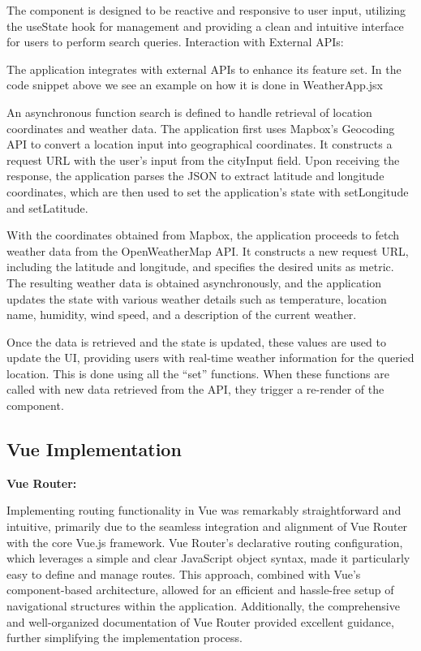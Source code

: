 The component is designed to be reactive and responsive to user input, utilizing the useState hook for management and providing a clean and intuitive interface for users to perform search queries. 
Interaction with External APIs:

 

The application integrates with external APIs to enhance its feature set. In the code snippet above we see an example on how it is done in WeatherApp.jsx

An asynchronous function search is defined to handle retrieval of location coordinates and weather data. The application first uses Mapbox's Geocoding API to convert a location input into geographical coordinates. It constructs a request URL with the user's input from the cityInput field. Upon receiving the response, the application parses the JSON to extract latitude and longitude coordinates, which are then used to set the application's state with setLongitude and setLatitude.

With the coordinates obtained from Mapbox, the application proceeds to fetch weather data from the OpenWeatherMap API. It constructs a new request URL, including the latitude and longitude, and specifies the desired units as metric. The resulting weather data is obtained asynchronously, and the application updates the state with various weather details such as temperature, location name, humidity, wind speed, and a description of the current weather.

Once the data is retrieved and the state is updated, these values are used to update the UI, providing users with real-time weather information for the queried location. This is done using all the “set” functions. When these functions are called with new data retrieved from the API, they trigger a re-render of the component. 

\subsection{Vue Implementation}

\textbf{Vue Router:}

Implementing routing functionality in Vue was remarkably straightforward and intuitive, primarily due to the seamless integration and alignment of Vue Router with the core Vue.js framework. Vue Router's declarative routing configuration, which leverages a simple and clear JavaScript object syntax, made it particularly easy to define and manage routes. This approach, combined with Vue's component-based architecture, allowed for an efficient and hassle-free setup of navigational structures within the application. Additionally, the comprehensive and well-organized documentation of Vue Router provided excellent guidance, further simplifying the implementation process.


